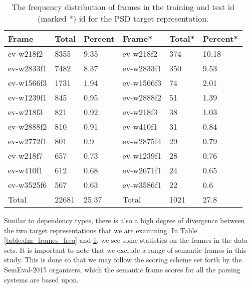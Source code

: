 \begin{table}
    \centering
    \smaller[0.7]
    \begin{tabular}{@{}llllll@{}}
        \toprule
        \textbf{Frame} & \textbf{Total} & \textbf{Percent} & \textbf{Frame*} & \textbf{Total*} & \textbf{Percent*} \\
        \midrule
        ev-w218f2 & 8355 & 9.35 & ev-w218f2 & 374 & 10.18 \\
        ev-w2833f1 & 7482 & 8.37 & ev-w2833f1 & 350 & 9.53 \\
        ev-w1566f3 & 1731 & 1.94 & ev-w1566f3 & 74 & 2.01 \\
        ev-w1239f1 & 845 & 0.95 & ev-w2888f2 & 51 & 1.39 \\
        ev-w218f3 & 821 & 0.92 & ev-w218f3 & 38 & 1.03 \\
        ev-w2888f2 & 810 & 0.91 & ev-w410f1 & 31 & 0.84 \\
        ev-w2772f1 & 801 & 0.9 & ev-w2875f4 & 29 & 0.79 \\
        ev-w218f7 & 657 & 0.73 & ev-w1239f1 & 28 & 0.76 \\
        ev-w410f1 & 612 & 0.68 & ev-w2671f1 & 24 & 0.65 \\
        ev-w3525f6 & 567 & 0.63 & ev-w3586f1 & 22 & 0.6 \\
        \midrule
        Total & 22681 & 25.37  & Total & 1021 & 27.8 \\
        \bottomrule
    \end{tabular}
    \caption{The frequency distribution of frames in the training and test id (marked *) id for the PSD target representation.}
    \label{table:psd_frames_freq}
\end{table}

Similar to dependency types, there is also a high degree of divergence between the two target representations that we are examining. In Table \ref{table:dm_frames_freq} and \ref{table:psd_frames_freq}, we see some statistics on the frames in the data sets. It is important to note that we exclude a range of semantic frames in this study. This is done so that we may follow the scoring scheme set forth by the SemEval-2015 organizers, which the semantic frame scores for all the parsing systems are based upon.

